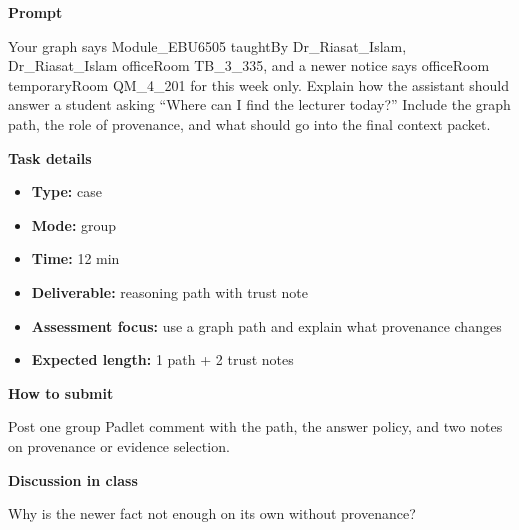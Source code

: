 \documentclass[11pt]{article}
\begin{document}
\begin{tcolorbox}[colback=white,colframe=MidnightBlue,title={Q4 Graph Path, Provenance, and Context},fonttitle=\bfseries,breakable]
\begin{center}
\end{center}

{\large\bfseries\color{MidnightBlue} Prompt}\par\medskip
Your graph says Module\_EBU6505 taughtBy Dr\_Riasat\_Islam, Dr\_Riasat\_Islam officeRoom TB\_3\_335, and a newer notice says officeRoom temporaryRoom QM\_4\_201 for this week only. Explain how the assistant should answer a student asking ``Where can I find the lecturer today?'' Include the graph path, the role of provenance, and what should go into the final context packet.

{\large\bfseries\color{MidnightBlue} Task details}\par\medskip
\begin{itemize}\item \textbf{Type:} case
\item \textbf{Mode:} group
\item \textbf{Time:} 12 min
\item \textbf{Deliverable:} reasoning path with trust note
\item \textbf{Assessment focus:} use a graph path and explain what provenance changes
\item \textbf{Expected length:} 1 path + 2 trust notes\end{itemize}

{\large\bfseries\color{MidnightBlue} How to submit}\par\medskip
Post one group Padlet comment with the path, the answer policy, and two notes on provenance or evidence selection.

{\large\bfseries\color{MidnightBlue} Discussion in class}\par\medskip
Why is the newer fact not enough on its own without provenance?


\end{tcolorbox}
\end{document}
